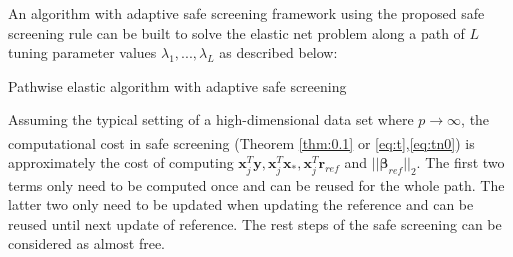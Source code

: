 An algorithm with adaptive safe screening framework \citep{wang2021adaptive} using the proposed safe screening rule can be built to solve the elastic net problem along a path of $L$ tuning parameter values $\lambda_1,...,\lambda_L$ as described below:

\begin{algorithm}[H]
  \label{alg:path}
    \SetAlgoLined
    \BlankLine
    
    \caption{Pathwise elastic algorithm with adaptive safe screening}
\end{algorithm}

Assuming the typical setting of a high-dimensional data set where $p\xrightarrow[]{}\infty$, the computational cost in safe screening (Theorem \ref{thm:0.1} or \eqref{eq:t},\eqref{eq:tn0}) is approximately the cost of computing $\boldsymbol x_j^T\boldsymbol y,\boldsymbol x_j^T\boldsymbol x_*,\boldsymbol x_j^T\boldsymbol r_{ref}$ and $||\boldsymbol\beta_{ref}||_2$. The first two terms only need to be computed once and can be reused for the whole path. The latter two only need to be updated when updating the reference and can be reused until next update of reference. The rest steps of the safe screening can be considered as almost free.

